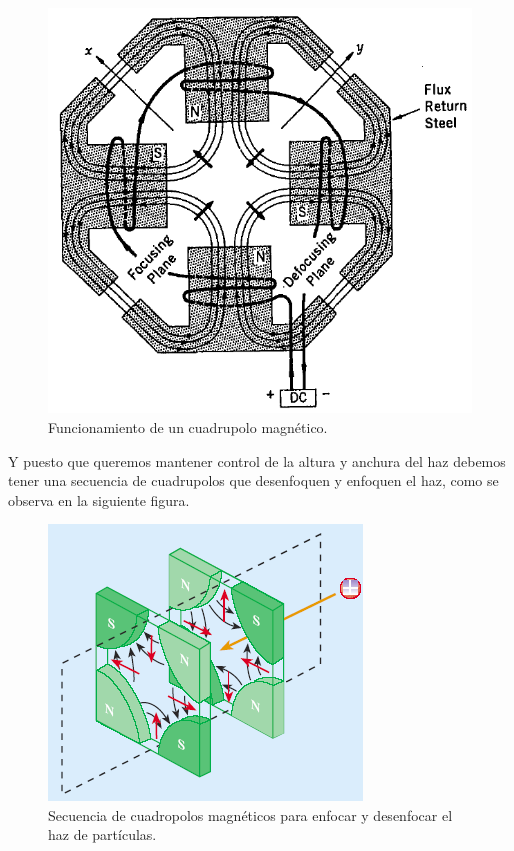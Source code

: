 \documentclass[./../main.tex]{subfiles}
\begin{document}
\begin{exercise}
\begin{solution}
            \begin{figure}[htb]
                \centering
                \includegraphics[scale = 0.8]{quadrupole-principle}
                \caption{Funcionamiento de un cuadrupolo magnético. \parencite{das2003introduction}}
                \label{fig:quadrupole-principle}
            \end{figure}

            Y puesto que queremos mantener control de la altura y anchura del haz debemos tener una secuencia de cuadrupolos que desenfoquen y enfoquen el haz, como se observa en la siguiente figura.

            \begin{figure}[htb]
                \centering
                \includegraphics{quadrupole-array}
                \caption{Secuencia de cuadropolos magnéticos para enfocar y desenfocar el haz de partículas. \parencite{LHC2023}}
            \end{figure}
        \end{solution}
    \end{exercise}
\end{document}
